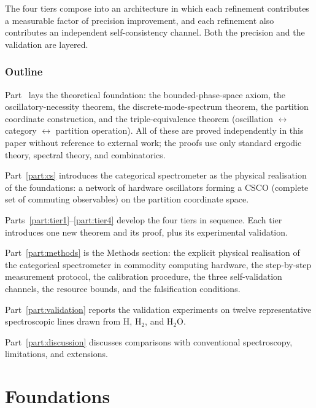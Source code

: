 \documentclass[11pt,a4paper]{article}
\theoremstyle{thmstyle}
\theoremstyle{axiomstyle}
\theoremstyle{definition}
\theoremstyle{remark}
\begin{document}
The four tiers compose into an architecture in which each refinement contributes a measurable factor of precision improvement, and each refinement also contributes an independent self-consistency channel. Both the precision and the validation are layered.

\section{Outline}
\label{sec:outline}

Part~\ref{part:foundations} lays the theoretical foundation: the bounded-phase-space axiom, the oscillatory-necessity theorem, the discrete-mode-spectrum theorem, the partition coordinate construction, and the triple-equivalence theorem (oscillation $\leftrightarrow$ category $\leftrightarrow$ partition operation). All of these are proved independently in this paper without reference to external work; the proofs use only standard ergodic theory, spectral theory, and combinatorics.

Part~\ref{part:cs} introduces the categorical spectrometer as the physical realisation of the foundations: a network of hardware oscillators forming a CSCO (complete set of commuting observables) on the partition coordinate space.

Parts~\ref{part:tier1}--\ref{part:tier4} develop the four tiers in sequence. Each tier introduces one new theorem and its proof, plus its experimental validation.

Part~\ref{part:methods} is the Methods section: the explicit physical realisation of the categorical spectrometer in commodity computing hardware, the step-by-step measurement protocol, the calibration procedure, the three self-validation channels, the resource bounds, and the falsification conditions.

Part~\ref{part:validation} reports the validation experiments on twelve representative spectroscopic lines drawn from H, H$_{2}$, and H$_{2}$O.

Part~\ref{part:discussion} discusses comparisons with conventional spectroscopy, limitations, and extensions.

\clearpage

\part{Foundations}
\label{part:foundations}
\end{document}
